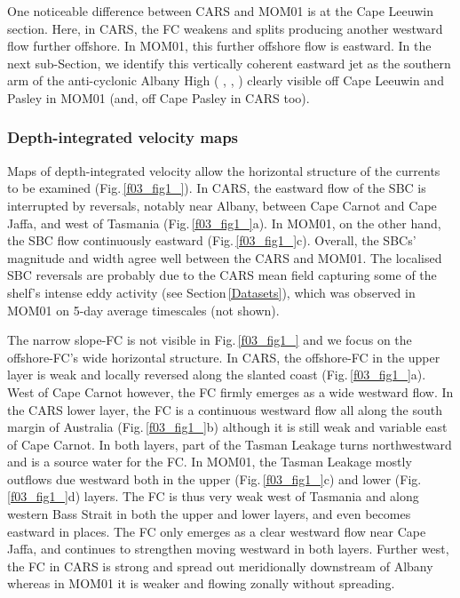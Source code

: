 \documentclass[preprint,3p,review,12pt]{elsarticle}
\begin{document}
One noticeable difference between CARS and MOM01 is at the Cape Leeuwin section. Here, in CARS, the FC weakens and splits producing another westward flow further offshore. In MOM01, this further offshore flow is eastward. 
In the next sub-Section, we identify this vertically coherent eastward jet as the southern arm of the anti-cyclonic Albany High (\citeauthor{Middleton2003} \citeyear{Middleton2003}, \citeauthor{Middleton2007} \citeyear{Middleton2007}, \citeauthor{McCartney2007} \citeyear{McCartney2007}) clearly visible off Cape Leeuwin and Pasley in MOM01 (and, off Cape Pasley in CARS too).

\subsubsection{Depth-integrated velocity maps}\label{Depth-integrated velocity maps}
Maps of depth-integrated velocity allow the horizontal structure of the currents to be examined (Fig.\,\ref{f03_fig1_}). In CARS, the eastward flow of the SBC is interrupted by reversals, notably near Albany, between Cape Carnot and Cape Jaffa, and west of Tasmania (Fig.\,\ref{f03_fig1_}a). In MOM01, on the other hand, the SBC flow continuously eastward (Fig.\,\ref{f03_fig1_}c). Overall, the SBCs' magnitude and width agree well between the CARS and MOM01.
The localised SBC reversals are probably due to the CARS mean field capturing some of the shelf's intense eddy activity (see Section\,\ref{Datasets}), which was observed in MOM01 on 5-day average timescales (not shown).

The narrow slope-FC is not visible in Fig.\,\ref{f03_fig1_} and we focus on the offshore-FC's wide horizontal structure.
In CARS, the offshore-FC in the upper layer is weak and locally reversed along the slanted coast (Fig.\,\ref{f03_fig1_}a). West of Cape Carnot however, the FC firmly emerges as a wide westward flow.
In the CARS lower layer, the FC is a continuous westward flow all along the south margin of Australia (Fig.\,\ref{f03_fig1_}b) although it is still weak and variable east of Cape Carnot.
In both layers, part of the Tasman Leakage turns northwestward and is a source water for the FC\@.
In MOM01, the Tasman Leakage mostly outflows due westward both in the upper (Fig.\,\ref{f03_fig1_}c) and lower (Fig.\,\ref{f03_fig1_}d) layers. The FC is thus very weak west of Tasmania and along western Bass Strait in both the upper and lower layers, and even becomes eastward in places. The FC only emerges as a clear westward flow near Cape Jaffa, and continues to strengthen moving westward in both layers. 
Further west, the FC in CARS
is strong and spread out meridionally downstream of Albany whereas in MOM01 it is weaker and flowing zonally without spreading.
\end{document}
